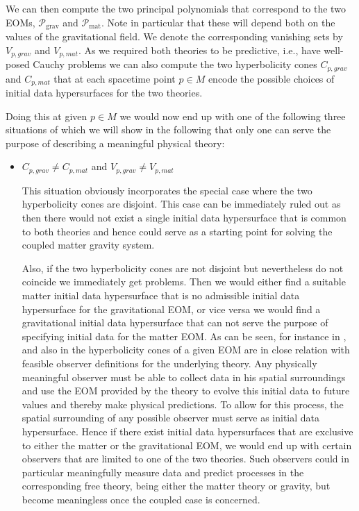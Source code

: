 We can then compute the two principal polynomials that correspond to the two EOMs, $\mathcal{P}_{\text{grav}}$ and $\mathcal{P}_{\text{mat}}$. Note in particular that these will depend both on the values of the gravitational field. We denote the corresponding vanishing sets by $V_{p,grav}$ and $V_{p,mat}$. As we required both theories to be predictive, i.e., have well-posed Cauchy problems we can also compute the two hyperbolicity cones $C_{p,grav}$ and $C_{p,mat}$ that at each spacetime point $p\in M$ encode the possible choices of initial data hypersurfaces for the two theories. 

Doing this at given $p \in M$ we would now end up with one of the following three situations of which we will show in the following that only one can serve the purpose of describing a meaningful physical theory:
\begin{itemize}
    \item $C_{p,grav} \neq C_{p,mat}$ and $V_{p,grav} \neq V_{p,mat}$
    
This situation obviously incorporates the special case where the two hyperbolicity cones are disjoint. This case can be immediately ruled out as then there would not exist a single initial data hypersurface that is common to both theories and hence could serve as a starting point for solving the coupled matter gravity system.   

Also, if the two hyperbolicity cones are not disjoint but nevertheless do not coincide we immediately get problems. Then we would either find a suitable matter initial data hypersurface that is no admissible initial data hypersurface for the gravitational EOM, or vice versa we would find a gravitational initial data hypersurface that can not serve the purpose of specifying initial data for the matter EOM. As can be seen, for instance in \cite{Rivera}, and also in \cite{2011PhRvD..83d4047R} the hyperbolicity cones of a given EOM are in close relation with feasible observer definitions for the underlying theory. Any physically meaningful observer must be able to collect data in his spatial surroundings and use the EOM provided by the theory to evolve this initial data to future values and thereby make physical predictions. To allow for this process, the spatial surrounding of any possible observer must serve as initial data hypersurface. Hence if there exist initial data hypersurfaces that are exclusive to either the matter or the gravitational EOM, we would end up with certain observers that are limited to one of the two theories. Such observers could in particular meaningfully measure data and predict processes in the corresponding free theory, being either the matter theory or gravity, but become meaningless once the coupled case is concerned.


\end{itemize}
